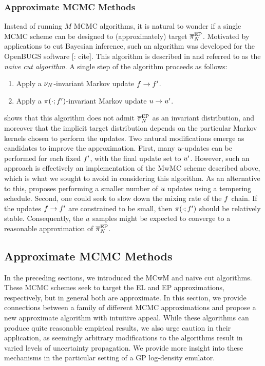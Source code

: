 \documentclass[12pt]{article}
\begin{document}
\subsubsection{Approximate MCMC Methods}
Instead of running $M$ MCMC algorithms, it is natural to wonder if a single MCMC scheme can be designed
to (approximately) target $\overline{\pi}_{N}^{\mathrm{EP}}$. Motivated by applications to cut Bayesian inference, 
such an algorithm was developed for the OpenBUGS software [\todo: cite]. This algorithm is described in 
\citep{PlummerCut} and referred to as the \textit{naive cut algorithm}. A single step of the algorithm proceeds
as follows:
\begin{enumerate}
\item Apply a $\nu_{N}$-invariant Markov update $f \to f^\prime$.
\item Apply a $\pi(\cdot; f^\prime)$-invariant Markov update $u \to u^\prime$.
\end{enumerate}
\citet{PlummerCut} shows that this algorithm does not admit $\overline{\pi}_{N}^{\mathrm{EP}}$ as an invariant
distribution, and moreover that the implicit target distribution depends on the particular Markov kernels
chosen to perform the updates. Two natural modifications emerge as candidates to improve the approximation.
First, many $u$-updates can be performed for each fixed $f^\prime$, with the final update
set to $u^\prime$. However, such an approach is effectively an implementation of the MwMC scheme
described above, which is what we sought to avoid in considering this algorithm. As an alternative to this,
\citet{PlummerCut} proposes performing a smaller number of $u$ updates using a tempering schedule.
Second, one could 
seek to slow down the mixing rate of the $f$ chain. If the updates  $f \to f^\prime$
are constrained to be small, then $\pi(\cdot; f^\prime)$ should be relatively stable. Consequently,
the $u$ samples might be expected to converge to a reasonable approximation of $\overline{\pi}_{N}^{\mathrm{EP}}$.

\subsection{Approximate MCMC Methods}
In the preceding sections, we introduced the MCwM and naive cut algorithms. These MCMC schemes
seek to target the EL and EP approximations, respectively, but in general both are approximate.
In this section, we provide connections between a family of different MCMC approximations and propose
a new approximate algorithm with intuitive appeal. While these algorithms can produce quite reasonable
empirical results, we also urge caution in their application, as seemingly arbitrary modifications to the 
algorithms result in varied levels of uncertainty propagation. We provide more insight into these mechanisms
in the particular setting of a GP log-density emulator.
\end{document}
